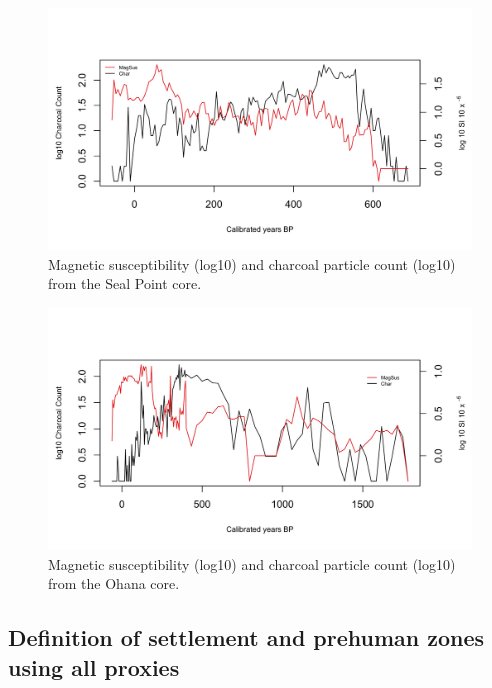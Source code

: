 \documentclass{article}
\begin{document}
\begin{figure}[H]
	\centering
	\includegraphics[scale=0.2]{mag-sus-seal.jpeg}
	\caption[Magnetic susceptibility (log10) and charcoal particle count (log10) from the Seal Point core]{Magnetic susceptibility (log10) and charcoal particle count (log10) from the Seal Point core.}
	\label{fig:mag-sus-seal}
\end{figure}

\begin{figure}[!ht]
	\centering
	\includegraphics[scale=0.2]{mag-sus-ohana.jpeg}
	\caption[Magnetic susceptibility (log10) and charcoal particle count (log10) from the Ohana core]{Magnetic susceptibility (log10) and charcoal particle count (log10) from the Ohana core.}
	\label{fig:mag-sus-ohana}
\end{figure}

\subsection{Definition of settlement and prehuman zones using all
proxies}
\end{document}

